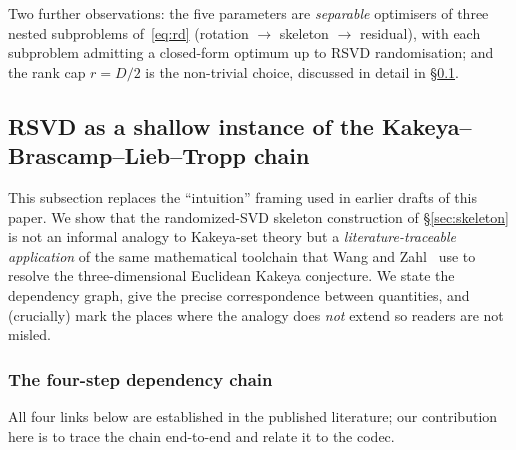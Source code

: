 \documentclass[11pt,a4paper]{article}
\theoremstyle{definition}
\theoremstyle{plain}
\begin{document}
Two further observations: the five parameters are \emph{separable} optimisers of three nested subproblems of~\eqref{eq:rd} (rotation $\to$ skeleton $\to$ residual), with each subproblem admitting a closed-form optimum up to RSVD randomisation; and the rank cap $r = D/2$ is the non-trivial choice, discussed in detail in \S\ref{sec:kbl-chain}.

\subsection{RSVD as a shallow instance of the Kakeya--Brascamp--Lieb--Tropp chain}
\label{sec:kbl-chain}

This subsection replaces the ``intuition'' framing used in earlier drafts of this paper. We show that the randomized-SVD skeleton construction of \S\ref{sec:skeleton} is not an informal analogy to Kakeya-set theory but a \emph{literature-traceable application} of the same mathematical toolchain that Wang and Zahl~\cite{wang-zahl} use to resolve the three-dimensional Euclidean Kakeya conjecture. We state the dependency graph, give the precise correspondence between quantities, and (crucially) mark the places where the analogy does \emph{not} extend so readers are not misled.

\subsubsection*{The four-step dependency chain}

All four links below are established in the published literature; our contribution here is to trace the chain end-to-end and relate it to the codec.
\end{document}
